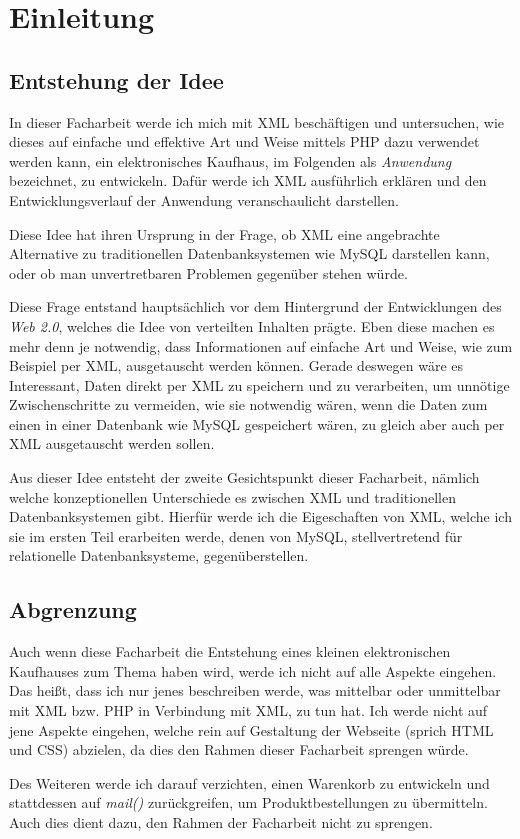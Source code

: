 

\chapter{Einleitung}
\section{Entstehung der Idee}
In dieser Facharbeit werde ich mich mit XML beschäftigen und
untersuchen, wie dieses auf einfache und effektive Art und Weise
mittels PHP dazu verwendet werden kann, ein elektronisches Kaufhaus,
im Folgenden als {\em Anwendung} bezeichnet, zu entwickeln. Dafür werde
ich XML ausführlich erklären und den Entwicklungsverlauf der Anwendung
veranschaulicht darstellen.

Diese Idee hat ihren Ursprung in der Frage, ob XML eine angebrachte
Alternative zu traditionellen Datenbanksystemen wie MySQL darstellen
kann, oder ob man unvertretbaren Problemen gegenüber stehen würde.

Diese Frage entstand hauptsächlich vor dem Hintergrund der
Entwicklungen des {\em Web 2.0}, welches die Idee von verteilten
Inhalten prägte. Eben diese machen es mehr denn je notwendig, dass
Informationen auf einfache Art und Weise, wie zum Beispiel per XML,
ausgetauscht werden können. Gerade deswegen wäre es Interessant, Daten
direkt per XML zu speichern und zu verarbeiten, um unnötige
Zwischenschritte zu vermeiden, wie sie notwendig wären, wenn die Daten
zum einen in einer Datenbank wie MySQL gespeichert wären, zu gleich
aber auch per XML ausgetauscht werden sollen.

Aus dieser Idee entsteht der zweite Gesichtspunkt dieser Facharbeit,
nämlich welche konzeptionellen Unterschiede es zwischen XML und
traditionellen Datenbanksystemen gibt. Hierfür werde ich die
Eigeschaften von XML, welche ich sie im ersten Teil erarbeiten werde,
denen von MySQL, stellvertretend für relationelle Datenbanksysteme,
gegenüberstellen.

\section{Abgrenzung}
Auch wenn diese Facharbeit die Entstehung eines kleinen elektronischen
Kaufhauses zum Thema haben wird, werde ich nicht auf alle Aspekte
eingehen. Das heißt, dass ich nur jenes beschreiben werde, was
mittelbar oder unmittelbar mit XML bzw. PHP in Verbindung mit XML, zu
tun hat. Ich werde nicht auf jene Aspekte eingehen, welche rein auf
Gestaltung der Webseite (sprich HTML und CSS) abzielen, da dies den
Rahmen dieser Facharbeit sprengen würde.

Des Weiteren werde ich darauf verzichten, einen Warenkorb zu
entwickeln und stattdessen auf {\em mail()} zurückgreifen, um
Produktbestellungen zu übermitteln. Auch dies dient dazu, den Rahmen
der Facharbeit nicht zu sprengen.

